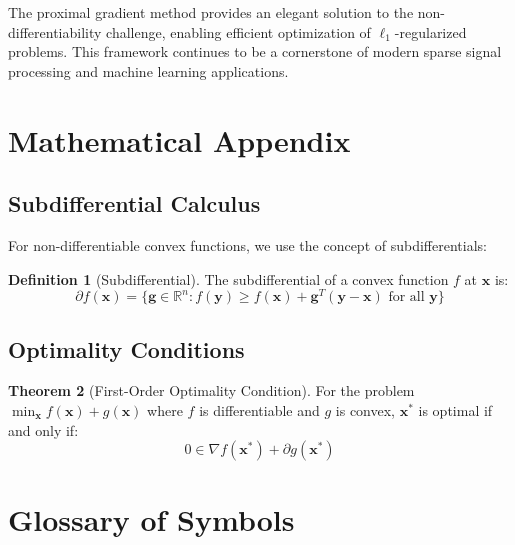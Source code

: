 \documentclass[12pt]{article}
\renewcommand{\vec}[1]{\mathbf{#1}}
\newcommand{\R}{\mathbb{R}}
\theoremstyle{definition}
\newtheorem{theorem}{Theorem}[section]
\newtheorem{definition}[theorem]{Definition}
\begin{document}
The proximal gradient method provides an elegant solution to the non-differentiability challenge, enabling efficient optimization of $\ell_1$-regularized problems. This framework continues to be a cornerstone of modern sparse signal processing and machine learning applications.

\newpage

\section{Mathematical Appendix}

\subsection{Subdifferential Calculus}

For non-differentiable convex functions, we use the concept of subdifferentials:

\begin{definition}[Subdifferential]
    The subdifferential of a convex function $f$ at $\vec{x}$ is:
    \begin{equation}
        \partial f(\vec{x}) = \{\vec{g} \in \R^n : f(\vec{y}) \geq f(\vec{x}) + \vec{g}^T(\vec{y} - \vec{x}) \text{ for all } \vec{y}\}
    \end{equation}
\end{definition}

\subsection{Optimality Conditions}

\begin{theorem}[First-Order Optimality Condition]
    For the problem $\min_{\vec{x}} f(\vec{x}) + g(\vec{x})$ where $f$ is differentiable and $g$ is convex, $\vec{x}^*$ is optimal if and only if:
    \begin{equation}
        0 \in \nabla f(\vec{x}^*) + \partial g(\vec{x}^*)
    \end{equation}
\end{theorem}

\section{Glossary of Symbols}
\end{document}
